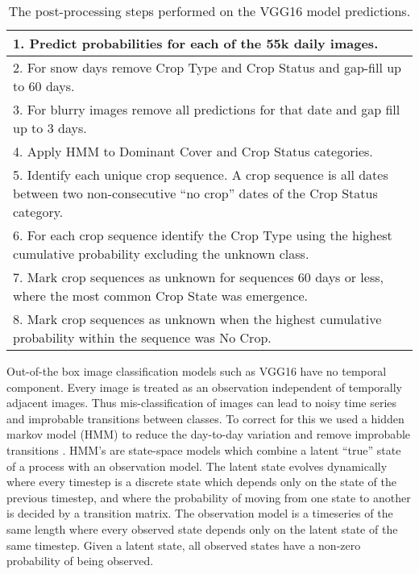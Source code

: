 \documentclass{article}
\begin{document}
\begin{table}[]
\centering
\begin{tabular}{|p{12cm}|}
\hline
1. Predict probabilities for each of the 55k daily images.                                                                                   \\ \hline
2. For snow days remove Crop Type and Crop Status and gap-fill up to 60 days.                                                                \\ \hline
3. For blurry images remove all predictions for that date and gap fill up to 3 days.                                                         \\ \hline
4. Apply HMM to Dominant Cover and Crop Status categories.                                                                                   \\ \hline
5. Identify each unique crop sequence. A crop sequence is all dates between two non-consecutive “no crop” dates of the Crop Status category. \\ \hline
6. For each crop sequence identify the Crop Type using the highest cumulative probability excluding the unknown class.                       \\ \hline
7. Mark crop sequences as unknown for sequences 60 days or less, where the most common Crop State was emergence.                             \\ \hline
8. Mark crop sequences as unknown when the highest cumulative probability within the sequence was No Crop.                                   \\ \hline
\end{tabular}
\caption{The post-processing steps performed on the VGG16 model predictions.}
\label{tab:table2}
\end{table}

Out-of-the box image classification models such as VGG16 have no temporal component. Every image is treated as an observation independent of temporally adjacent images. Thus mis-classification of images can lead to noisy time series and improbable transitions between classes. To correct for this we used a hidden markov model (HMM) to reduce the day-to-day variation and remove improbable transitions \citep{esmael2012, wehmann2015}. HMM’s are state-space models which combine a latent “true” state of a process with an observation model. The latent state evolves dynamically where every timestep is a discrete state which depends only on the state of the previous timestep, and where the probability of moving from one state to another is decided by a transition matrix. The observation model is a timeseries of the same length where every observed state depends only on the latent state of the same timestep. Given a latent state, all observed states have a non-zero probability of being observed.
\end{document}

